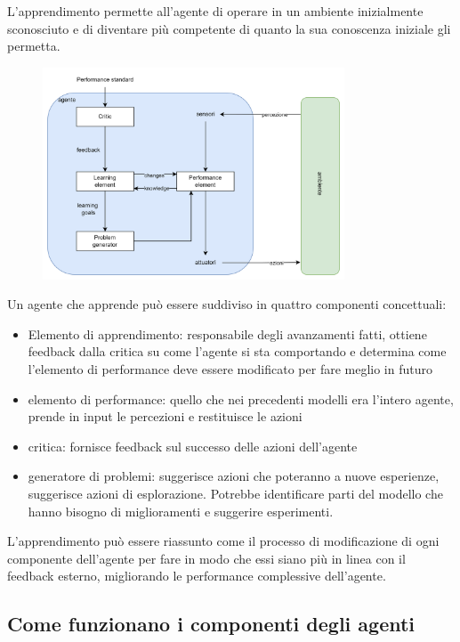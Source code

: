L'apprendimento permette all'agente di operare in un ambiente inizialmente sconosciuto e di diventare più competente di quanto la sua conoscenza iniziale gli permetta.

\begin{figure}[H]
	\centering
	\includegraphics[width=0.8\textwidth]{capitoli/agenti-intelligenti/imgs/learning.png}
\end{figure}

Un agente che apprende può essere suddiviso in quattro componenti concettuali:

\begin{itemize}
	\item Elemento di apprendimento: responsabile degli avanzamenti fatti, ottiene feedback dalla critica su come l'agente si sta comportando e determina come l'elemento di performance deve essere modificato per fare meglio in futuro
	\item elemento di performance: quello che nei precedenti modelli era l'intero agente, prende in input le percezioni e restituisce le azioni
	\item critica: fornisce feedback sul successo delle azioni dell'agente
	\item generatore di problemi: suggerisce azioni che poteranno a nuove esperienze, suggerisce azioni di esplorazione. Potrebbe identificare parti del modello che hanno bisogno di miglioramenti e suggerire esperimenti.
\end{itemize}

L'apprendimento può essere riassunto come il processo di modificazione di ogni componente dell'agente per fare in modo che essi siano più in linea con il feedback esterno, migliorando le performance complessive dell'agente.

\subsection{Come funzionano i componenti degli agenti}

